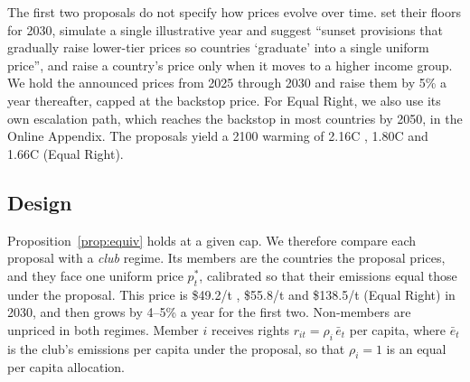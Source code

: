 \documentclass[12pt,english]{article}
\theoremstyle{remark}
\begin{document}
The first two proposals do not specify how prices evolve over time. \citet{parry_proposal_2021} set their floors for 2030, \citet{wolfram_building_2025} simulate a single illustrative year and suggest ``sunset provisions that gradually raise lower-tier prices so countries `graduate' into a single uniform price'', and \citet{banerjee_grand_2025} raise a country's price only when it moves to a higher income group. %
We hold the announced prices from 2025 through 2030 and raise them by 5\% a year thereafter, capped at the backstop price. For Equal Right, we also use its own escalation path, which reaches the backstop in most countries by 2050, in the Online Appendix. The proposals yield a 2100 warming of 2.16\textdegree C \citep{wolfram_building_2025}, 1.80\textdegree C \citep{banerjee_grand_2025} and 1.66\textdegree C (Equal Right).

\subsection{Design}

Proposition~\ref{prop:equiv} holds at a given cap. We therefore compare each proposal with a \emph{club} regime. Its members are the countries the proposal prices, and they face one uniform price $p^*_t$, calibrated so that their emissions equal those under the proposal. This price is \$49.2/t \citep{wolfram_building_2025}, \$55.8/t \citep{banerjee_grand_2025} and \$138.5/t (Equal Right) in 2030, and then grows by 4--5\% a year for the first two. Non-members are unpriced in both regimes. Member $i$ receives rights $r_{it}=\rho_i\,\bar e_t$ per capita, where $\bar e_t$ is the club's emissions per capita under the proposal, so that $\rho_i=1$ is an equal per capita allocation.
\end{document}
